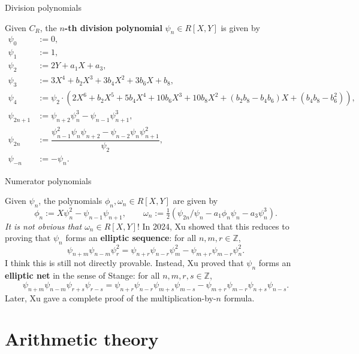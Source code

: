 \documentclass[10pt]{beamer}
\begin{document}
\begin{frame}[t]{Division polynomials}

\begin{definition}
Given $ C_R $, the \textbf{$ n $-th division polynomial} $ \psi_n \in R[X, Y] $ is given by
\begin{align*}
\psi_0 & := 0, \\
\psi_1 & := 1, \\
\psi_2 & := 2Y + a_1X + a_3, \\
\psi_3 & := 3X^4 + b_2X^3 + 3b_4X^2 + 3b_6X + b_8, \\
\psi_4 & := \psi_2 \cdot ({\scriptstyle 2X^6 + b_2X^5 + 5b_4X^4 + 10b_6X^3 + 10b_8X^2 + (b_2b_8 - b_4b_6)X + (b_4b_8 - b_6^2)}), \\
\psi_{2n + 1} & := \psi_{n + 2}\psi_n^3 - \psi_{n - 1}\psi_{n + 1}^3, \\
\psi_{2n} & := \dfrac{\psi_{n - 1}^2\psi_n\psi_{n + 2} - \psi_{n - 2}\psi_n\psi_{n + 1}^2}{\psi_2}, \\
\psi_{-n} & := -\psi_n.
\end{align*}
\end{definition}

\end{frame}

\begin{frame}[t]{Numerator polynomials}

Given $ \psi_n $, the polynomials $ \phi_n, \omega_n \in R[X, Y] $ are given by
$$ \phi_n := X\psi_n^2 - \psi_{n - 1}\psi_{n + 1}, \qquad \omega_n := \tfrac{1}{2}(\psi_{2n} / \psi_n - a_1\phi_n\psi_n - a_3\psi_n^3). $$
\emph{It is not obvious that $ \omega_n \in R[X, Y] $}! In 2024, Xu showed that this reduces to proving that $ \psi_n $ forms an \textbf{elliptic sequence}: for all $ n, m, r \in \mathbb{Z} $,
$$ \psi_{n + m}\psi_{n - m}\psi_r^2 = \psi_{n + r}\psi_{n - r}\psi_m^2 - \psi_{m + r}\psi_{m - r}\psi_n^2. $$
I think this is still not directly provable. Instead, Xu proved that $ \psi_n $ forms an \textbf{elliptic net} in the sense of Stange: for all $ n, m, r, s \in \mathbb{Z} $,
$$ \psi_{n + m}\psi_{n - m}\psi_{r + s}\psi_{r - s} = \psi_{n + r}\psi_{n - r}\psi_{m + s}\psi_{m - s} - \psi_{m + r}\psi_{m - r}\psi_{n + s}\psi_{n - s}. $$
Later, Xu gave a complete proof of the multiplication-by-$ n $ formula.

\end{frame}

\section{Arithmetic theory}
\end{document}
